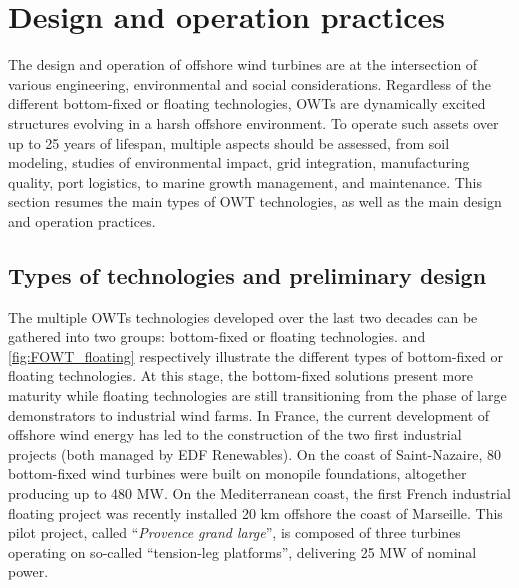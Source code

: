 \section{Design and operation practices} \label{sec:owt_design}

The design and operation of offshore wind turbines are at the intersection of various engineering, environmental and social considerations. 
Regardless of the different bottom-fixed or floating technologies, OWTs are dynamically excited structures evolving in a harsh offshore environment.   
To operate such assets over up to 25 years of lifespan, multiple aspects should be assessed, from soil modeling, studies of environmental impact, grid integration, manufacturing quality, port logistics, to marine growth management, and maintenance. 
This section resumes the main types of OWT technologies, as well as the main design and operation practices.   

\subsection{Types of technologies and preliminary design}
The multiple OWTs technologies developed over the last two decades can be gathered into two groups: bottom-fixed or floating technologies. 
 and \ref{fig:FOWT_floating} respectively illustrate the different types of bottom-fixed or floating technologies. 
At this stage, the bottom-fixed solutions present more maturity while floating technologies are still transitioning from the phase of large demonstrators to industrial wind farms. 
In France, the current development of offshore wind energy has led to the construction of the two first industrial projects (both managed by EDF Renewables). 
On the coast of Saint-Nazaire, 80 bottom-fixed wind turbines were built on monopile foundations, altogether producing up to 480 MW. 
On the Mediterranean coast, the first French industrial floating project was recently installed 20 km offshore the coast of Marseille. 
This pilot project, called ``\textit{Provence grand large}'', is composed of three turbines operating on so-called ``tension-leg platforms'', delivering 25 MW of nominal power.     

